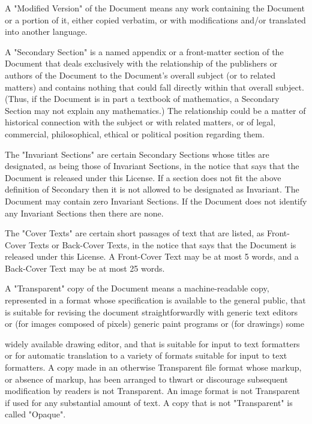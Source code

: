 \documentclass{article}
\begin{document}
A "Modified Version" of the Document means any work containing the Document or a portion of it, either copied verbatim, or with modifications and/or translated into another language. 

A "Secondary Section" is a named appendix or a front-matter section of the Document that deals exclusively with the relationship of the publishers or authors of the Document to the Document's overall subject (or to related matters) and contains nothing that could fall directly within that overall subject. (Thus, if the Document is in part a textbook of mathematics, a Secondary Section may not explain any mathematics.) The relationship could be a matter of historical connection with the subject or with related matters, or of legal, commercial, philosophical, ethical or political position regarding them. 

The "Invariant Sections" are certain Secondary Sections whose titles are designated, as being those of Invariant Sections, in the notice that says that the Document is released under this License. If a section does not fit the above definition of Secondary then it is not allowed to be designated as Invariant. The Document may contain zero Invariant Sections.  If the Document does not identify any Invariant Sections then there are none. 

The "Cover Texts" are certain short passages of text that are listed, as Front-Cover Texts or Back-Cover Texts, in the notice that says that the Document is released under this License.  A Front-Cover Text may be at most 5 words, and a Back-Cover Text may be at most 25 words. 

A "Transparent" copy of the Document means a machine-readable copy, represented in a format whose specification is available to the general public, that is suitable for revising the document straightforwardly with generic text editors or (for images composed of pixels) generic paint programs or (for drawings) some 



widely available drawing editor, and that is suitable for input to text formatters or for automatic translation to a variety of formats suitable for input to text formatters. A copy made in an otherwise Transparent file format whose markup, or absence of markup, has been arranged to thwart or discourage subsequent modification by readers is not Transparent. An image format is not Transparent if used for any substantial amount of text. A copy that is not "Transparent" is called "Opaque". 
\end{document}
